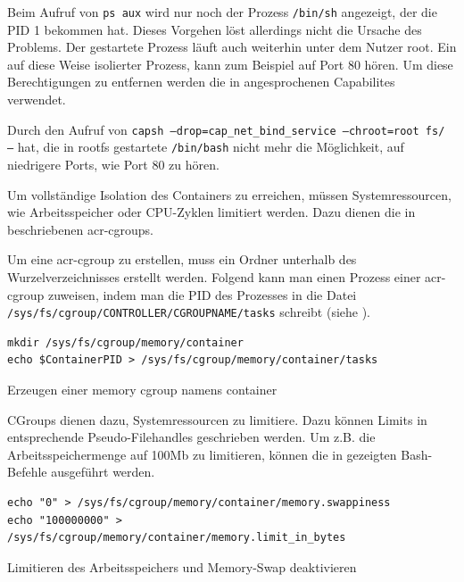 Beim Aufruf von \glqq \texttt{ps aux}\grqq{} wird nur noch der Prozess \texttt{/bin/sh} angezeigt, der die PID 1 bekommen hat. Dieses Vorgehen löst allerdings nicht die Ursache des Problems. Der gestartete Prozess läuft auch weiterhin unter dem Nutzer root. Ein auf diese Weise isolierter Prozess, kann zum Beispiel auf Port 80 hören. Um diese Berechtigungen zu entfernen werden die in  angesprochenen Capabilites verwendet.

Durch den Aufruf von \texttt{capsh --drop=cap_net_bind_service --chroot=root fs/ --} hat, die in rootfs gestartete \texttt{/bin/bash} nicht mehr die Möglichkeit, auf niedrigere Ports, wie Port 80 zu hören.


Um vollständige Isolation des Containers zu erreichen, müssen Systemressourcen, wie Arbeitsspeicher oder CPU-Zyklen limitiert werden. Dazu dienen die in  beschriebenen \glspl{acr-cgroup}.

Um eine \gls{acr-cgroup} zu erstellen, muss ein Ordner unterhalb des Wurzelverzeichnisses erstellt werden. Folgend kann man einen Prozess einer \gls{acr-cgroup} zuweisen, indem man die PID des Prozesses in die Datei \texttt{/sys/fs/cgroup/CONTROLLER/CGROUPNAME/tasks} schreibt (siehe ).

\begin{listing}[h]
	\begin{verbatim}
mkdir /sys/fs/cgroup/memory/container
echo $ContainerPID > /sys/fs/cgroup/memory/container/tasks
	\end{verbatim}
	\caption{Erzeugen einer memory cgroup namens container}
	\label{lst:cgroupZuweisen}
\end{listing}

CGroups dienen dazu, Systemressourcen zu limitiere. Dazu können Limits in entsprechende Pseudo-Filehandles geschrieben werden. Um z.B. die Arbeitsspeichermenge auf \tildeawesome100Mb zu limitieren, können die in  gezeigten Bash-Befehle ausgeführt werden. 

\begin{listing}[h]
	\begin{verbatim}
echo "0" > /sys/fs/cgroup/memory/container/memory.swappiness
echo "100000000" > /sys/fs/cgroup/memory/container/memory.limit_in_bytes
	\end{verbatim}
	\caption{Limitieren des Arbeitsspeichers und Memory-Swap deaktivieren}
	\label{lst:limitRam}
\end{listing}

